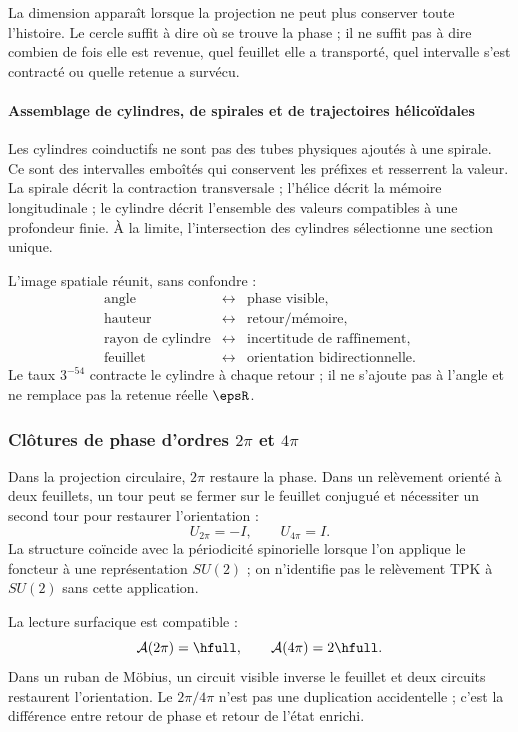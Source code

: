 \begin{narrativebox}
La dimension apparaît lorsque la projection ne peut plus conserver toute
l'histoire. Le cercle suffit à dire où se trouve la phase ; il ne
suffit pas à dire combien de fois elle est revenue, quel feuillet elle a transporté, quel intervalle
s'est contracté ou quelle retenue a survécu.
\end{narrativebox}

\paragraph{Assemblage de cylindres, de spirales et de trajectoires hélicoïdales}

Les cylindres coinductifs ne sont pas des tubes physiques ajoutés à une spirale. Ce sont
des intervalles emboîtés qui conservent les préfixes et resserrent la valeur. La spirale
décrit la contraction transversale ; l'hélice décrit la mémoire longitudinale ;
le cylindre décrit l'ensemble des valeurs compatibles à une profondeur
finie. À la limite, l'intersection des cylindres sélectionne une section
unique.

L'image spatiale réunit, sans confondre :
\[
\begin{array}{ccl}
\text{angle} &\leftrightarrow& \text{phase visible},\\
\text{hauteur} &\leftrightarrow& \text{retour/mémoire},\\
\text{rayon de cylindre} &\leftrightarrow& \text{incertitude de raffinement},\\
\text{feuillet} &\leftrightarrow& \text{orientation bidirectionnelle}.
\end{array}
\]
Le taux \(3^{-54}\) contracte le cylindre à chaque retour ; il ne s'ajoute pas à l'angle et
ne remplace pas la retenue réelle \(\epsR\).

\subsubsection{Clôtures de phase d'ordres \(2\pi\) et \(4\pi\)}

Dans la projection circulaire, \(2\pi\) restaure la phase. Dans un relèvement orienté
à deux feuillets, un tour peut se fermer sur le feuillet conjugué et nécessiter un
second tour pour restaurer l'orientation :
\[
U_{2\pi}=-I,\qquad U_{4\pi}=I.
\]
La structure coïncide avec la périodicité spinorielle lorsque l'on applique le
foncteur à une représentation \(SU(2)\) ; on n'identifie pas le relèvement TPK à
\(SU(2)\) sans cette application.

La lecture surfacique est compatible :
\[
\mathcal A(2\pi)=\hfull,\qquad
\mathcal A(4\pi)=2\hfull.
\]
Dans un ruban de Möbius, un circuit visible inverse le feuillet et deux circuits
restaurent l'orientation. Le \(2\pi/4\pi\) n'est pas une duplication accidentelle ;
c'est la différence entre retour de phase et retour de l'état enrichi.
